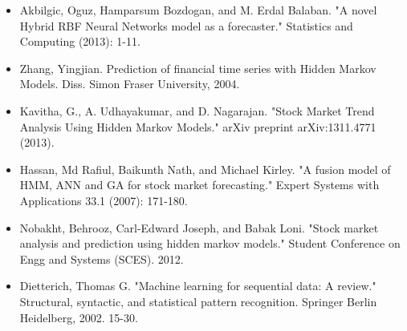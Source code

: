 \documentclass[11pt]{article}
\begin{document}
\begin{itemize}
  \item Akbilgic, Oguz, Hamparsum Bozdogan, and M. Erdal Balaban. "A novel
  Hybrid RBF Neural Networks model as a forecaster." Statistics and Computing (2013): 1-11.
  \item Zhang, Yingjian. Prediction of financial time series with Hidden Markov
  Models. Diss. Simon Fraser University, 2004.
  \item Kavitha, G., A. Udhayakumar, and D. Nagarajan. "Stock Market Trend
  Analysis Using Hidden Markov Models." arXiv preprint arXiv:1311.4771 (2013).
  \item Hassan, Md Rafiul, Baikunth Nath, and Michael Kirley. "A fusion model of
  HMM, ANN and GA for stock market forecasting." Expert Systems with Applications 33.1 (2007): 171-180.
  \item Nobakht, Behrooz, Carl-Edward Joseph, and Babak Loni. "Stock market
  analysis and prediction using hidden markov models." Student Conference on Engg and Systems (SCES). 2012.
  \item Dietterich, Thomas G. "Machine learning for sequential data: A review."
  Structural, syntactic, and statistical pattern recognition. Springer Berlin Heidelberg, 2002. 15-30.
\end{itemize}
\end{document}
